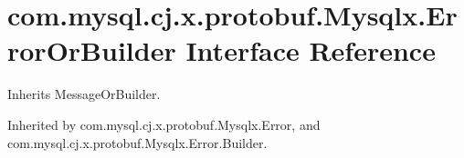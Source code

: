 \hypertarget{interfacecom_1_1mysql_1_1cj_1_1x_1_1protobuf_1_1_mysqlx_1_1_error_or_builder}{}\section{com.\+mysql.\+cj.\+x.\+protobuf.\+Mysqlx.\+Error\+Or\+Builder Interface Reference}
\label{interfacecom_1_1mysql_1_1cj_1_1x_1_1protobuf_1_1_mysqlx_1_1_error_or_builder}


Inherits Message\+Or\+Builder.



Inherited by com.\+mysql.\+cj.\+x.\+protobuf.\+Mysqlx.\+Error, and com.\+mysql.\+cj.\+x.\+protobuf.\+Mysqlx.\+Error.\+Builder.

